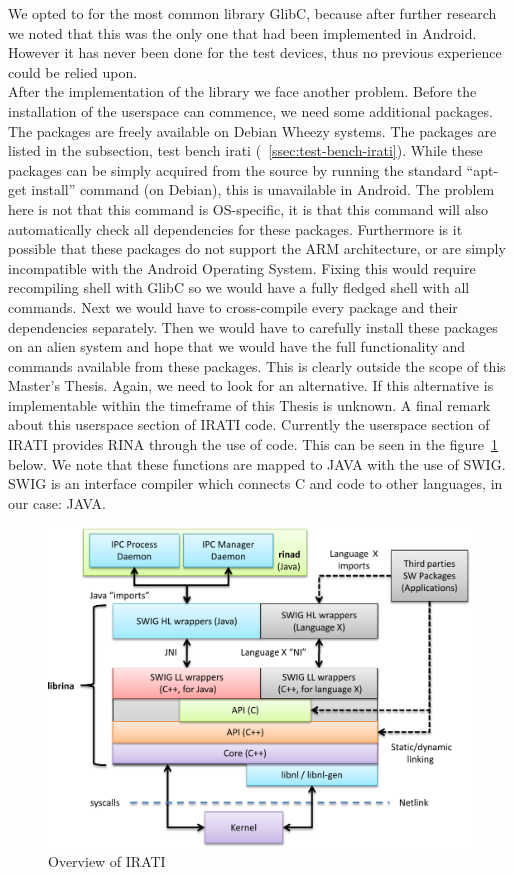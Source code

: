 We opted to for the most common library GlibC, because after further research we noted that this was the only one that had been implemented in Android. However it has never been done for the test devices, thus no previous experience could be relied upon. 
\\
After the implementation of the library we face another problem. Before the installation of the userspace can commence, we need some additional packages. The packages are freely available on Debian Wheezy systems. The packages are listed in the subsection, test bench irati (~\ref{ssec:test-bench-irati}). While these packages can be simply acquired from the source by running the standard ``apt-get install'' command (on Debian), this is unavailable in Android. The problem here is not that this command is OS-specific, it is that this command will also automatically check all dependencies for these packages. Furthermore is it possible that these packages do not support the ARM architecture, or are simply incompatible with the Android Operating System. 
\npar
Fixing this would require recompiling shell with GlibC so we would have a fully fledged shell with all commands. Next we would have to cross-compile every package and their dependencies separately. Then we would have to carefully install these packages on an alien system and hope that we would have the full functionality and commands available from these packages. This is clearly outside the scope of this Master's Thesis. Again, we need to look for an alternative. If this alternative is implementable within the timeframe of this Thesis is unknown.
\npar
A final remark about this userspace section of IRATI code. Currently the userspace section of IRATI provides RINA through the use of \cpp code. This can be seen in the figure~\ref{fig:userspacearch} below.  We note that these \cpp functions are mapped to JAVA with the use of SWIG. SWIG is an interface compiler which connects C and \cpp code to other languages, in our case: JAVA. 

\begin{figure}[H]
    \centering
    \includegraphics[width=1\textwidth]{figures/userspacearch}
    \caption{Overview of IRATI} 
    \label{fig:userspacearch}
\end{figure}

